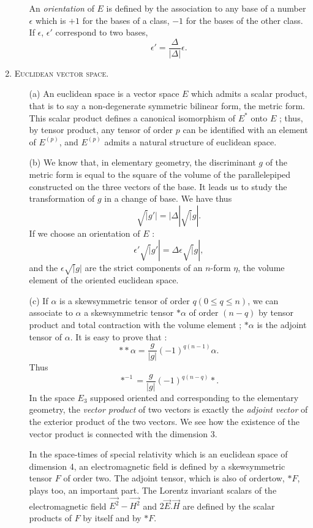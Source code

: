 \begin{enumerate}
\begin{itemize}
An \textit{orientation} of $E$ is defined by the association to any
base of a number $\epsilon$ which is $+1$ for the bases of a class, $-1$
for the bases of the other class. If $\epsilon$, $\epsilon'$ correspond to two
bases,
\begin{equation*}
\epsilon' = \frac{\Delta}{|\Delta|} \epsilon. \tag{2}
\end{equation*}
\end{itemize}

\item \textsc{Euclidean vector space.}\pageoriginale 
\begin{itemize}
\item[(a)] An euclidean space is a vector space $E$ which admits a
  scalar product, that is to say a non-degenerate symmetric bilinear
  form, the metric form. This scalar product defines a canonical
  isomorphism of $E^\ast$ onto $E$ ; thus, by tensor product, any
  tensor of order $p$ can be identified with an element of $E^{(p)}$,
  and $E^{(p)}$ admits a natural structure of euclidean space.

\item[(b)] We know that, in elementary geometry, the discriminant $g$ of
  the metric form is equal to the square of the volume of the
  parallelepiped constructed on the three vectors of the base. It
  leads us to study the transformation of $g$ in a change of base. We
  have thus
$$
\surd |g'| = |\Delta| \surd |g|.
$$
If we choose an orientation of $E$ :
$$
\epsilon' \surd |g'| = \Delta \epsilon \surd |g|,
$$
and the $\epsilon \surd |g|$ are the strict components of an $n$-form
$\eta$, the volume element of the oriented euclidean space. 

\item[(c)] If $\alpha$ is a skewsymmetric tensor of order $q (0 \leqslant q
  \leqslant n)$, we can associate to $\alpha$ a skewsymmetric tensor
  $\ast\alpha$ of order $(n-q)$ by tensor product and total
  contraction with the volume element ; $\ast \alpha$ is the adjoint
  tensor of $\alpha$. It is easy to prove that :
$$
\ast\ast \alpha = \frac{g}{|g|} (-1)^{q(n-1)} \alpha .
$$
Thus
$$
\ast^{-1} = \frac{g}{|g|} (-1)^{q(n-q)}\ast.
$$
In the space $E_3$ supposed oriented and corresponding to the
elementary geometry, the \textit{vector product} of two vectors is
exactly the \textit{adjoint vector} of the exterior product of the two
vectors. We see how the existence of the vector product is connected
with the dimension 3.

In the space-times of special relativity which is an euclidean space
of dimension 4, an electromagnetic field is defined by a skewsymmetric
tensor $F$ of order two. The adjoint tensor, which is also of
order\pageoriginale tow, $\ast F$, plays too, an important part. The
Lorentz invariant scalars of the electromagnetic field $\vec{E^2} -
\vec{H^2}$ and $2 \vec{E}. \vec{H}$ are defined by the scalar products
of $F$ by itself and by $\ast F$.
\end{itemize}


\end{enumerate}
